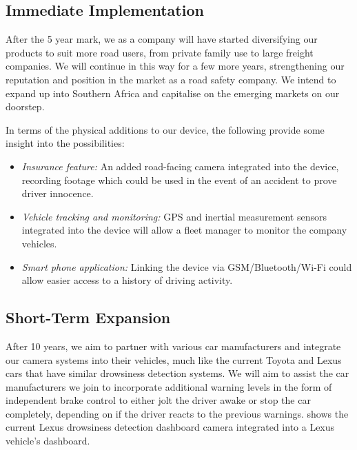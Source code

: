 \subsection{Immediate Implementation}
After the 5 year mark, we as a company will have started diversifying our products to suit more road users, from private family use to large freight companies. We will continue in this way for a few more years, strengthening our reputation and position in the market as a road safety company. We intend to expand up into Southern Africa and capitalise on the emerging markets on our doorstep.

In terms of the physical additions to our device, the following provide some insight into the possibilities:
\begin{itemize}
\item \textit{Insurance feature:} An added road-facing camera integrated into the device, recording footage which could be used in the event of an accident to prove driver innocence.

\item \textit{Vehicle tracking and monitoring:} GPS and inertial measurement sensors integrated into the device will allow a fleet manager to monitor the company vehicles.

\item \textit{Smart phone application:} Linking the device via GSM/Bluetooth/Wi-Fi could allow easier access to a history of driving activity.
\end{itemize}

\newpage 
\subsection{Short-Term Expansion}
After 10 years, we aim to partner with various car manufacturers and integrate our camera systems into their vehicles, much like the current Toyota \cite{toyota} and Lexus \cite{lexus} cars that have similar drowsiness detection systems. We will aim to assist the car manufacturers we join to incorporate additional warning levels in the form of independent brake control to either jolt the driver awake or stop the car completely, depending on if the driver reacts to the previous warnings.  shows the current Lexus drowsiness detection dashboard camera integrated into a Lexus vehicle's dashboard.

